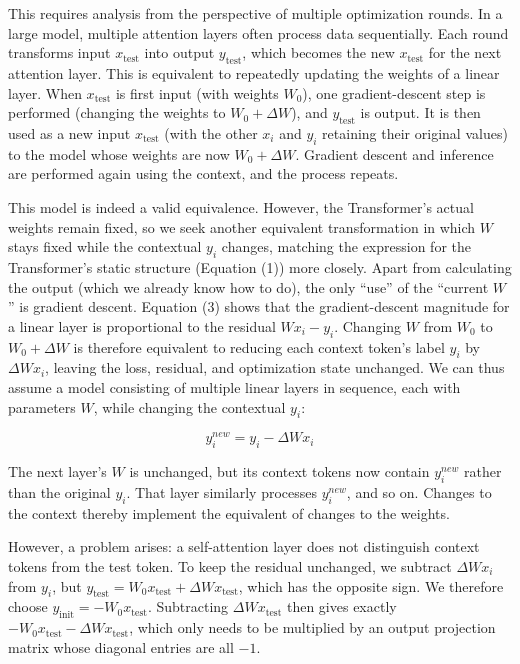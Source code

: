 This requires analysis from the perspective of multiple optimization rounds. In a large model, multiple attention layers often process data sequentially. Each round transforms input \(x_{\mathrm{test}}\) into output \(y_{\mathrm{test}}\), which becomes the new \(x_{\mathrm{test}}\) for the next attention layer. This is equivalent to repeatedly updating the weights of a linear layer. When \(x_{\mathrm{test}}\) is first input (with weights \(W_0\)), one gradient-descent step is performed (changing the weights to \(W_0+\Delta W\)), and \(y_{\mathrm{test}}\) is output. It is then used as a new input \(x_{\mathrm{test}}\) (with the other \(x_i\) and \(y_i\) retaining their original values) to the model whose weights are now \(W_0+\Delta W\). Gradient descent and inference are performed again using the context, and the process repeats.

This model is indeed a valid equivalence. However, the Transformer's actual weights remain fixed, so we seek another equivalent transformation in which \(W\) stays fixed while the contextual \(y_i\) changes, matching the expression for the Transformer's static structure (Equation (1)) more closely. Apart from calculating the output (which we already know how to do), the only ``use'' of the ``current \(W\)'' is gradient descent. Equation (3) shows that the gradient-descent magnitude for a linear layer is proportional to the residual \(Wx_i-y_i\). Changing \(W\) from \(W_0\) to \(W_0+\Delta W\) is therefore equivalent to reducing each context token's label \(y_i\) by \(\Delta Wx_i\), leaving the loss, residual, and optimization state unchanged. We can thus assume a model consisting of multiple linear layers in sequence, each with parameters \(W\), while changing the contextual \(y_i\):

\[
y_i^{new}=y_i-\Delta W x_i
\]

The next layer's \(W\) is unchanged, but its context tokens now contain \(y_i^{new}\) rather than the original \(y_i\). That layer similarly processes \(y_i^{new}\), and so on. Changes to the context thereby implement the equivalent of changes to the weights.

However, a problem arises: a self-attention layer does not distinguish context tokens from the test token. To keep the residual unchanged, we subtract \(\Delta Wx_i\) from \(y_i\), but \(y_{\mathrm{test}}=W_0x_{\mathrm{test}}+\Delta Wx_{\mathrm{test}}\), which has the opposite sign. We therefore choose \(y_{\mathrm{init}}=-W_0x_{\mathrm{test}}\). Subtracting \(\Delta Wx_{\mathrm{test}}\) then gives exactly \(-W_0x_{\mathrm{test}}-\Delta Wx_{\mathrm{test}}\), which only needs to be multiplied by an output projection matrix whose diagonal entries are all \(-1\).

